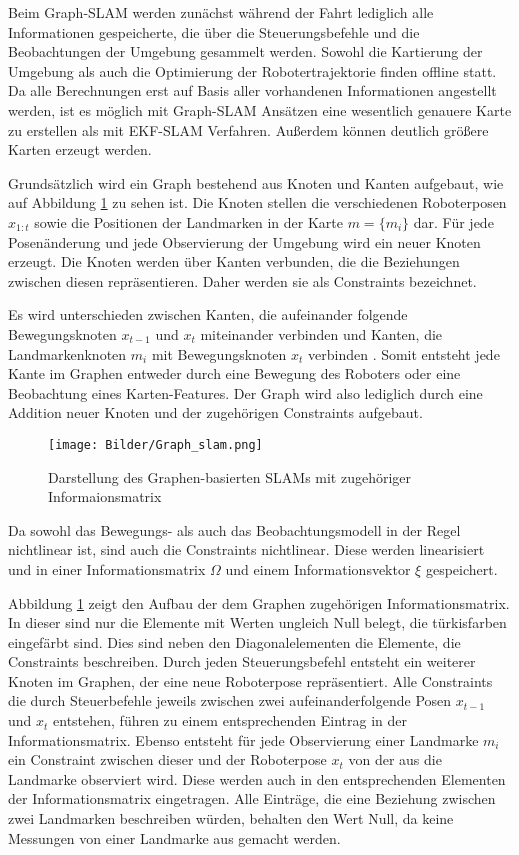 Beim Graph-SLAM werden zunächst während der Fahrt lediglich alle Informationen gespeicherte, die über die Steuerungsbefehle und die Beobachtungen der Umgebung gesammelt werden. Sowohl die Kartierung der Umgebung als auch die Optimierung der Robotertrajektorie finden offline statt. Da alle Berechnungen erst auf Basis aller vorhandenen Informationen  angestellt werden, ist es möglich mit Graph-SLAM Ansätzen eine wesentlich genauere Karte zu erstellen als mit EKF-SLAM Verfahren. Außerdem können deutlich größere Karten erzeugt werden. 

Grundsätzlich wird ein Graph bestehend aus Knoten und Kanten aufgebaut, wie auf Abbildung \ref{fig:Graph} zu sehen ist. Die Knoten stellen die verschiedenen Roboterposen $ x_{1:t} $ sowie die Positionen der Landmarken in der Karte $ m = \{m_i\} $ dar. Für jede Posenänderung und jede Observierung der Umgebung wird ein neuer Knoten erzeugt. Die Knoten werden über Kanten verbunden, die die Beziehungen zwischen diesen repräsentieren. Daher werden sie als Constraints bezeichnet. 

Es wird unterschieden zwischen Kanten, die aufeinander folgende Bewegungsknoten $x_{t-1}$ und $x_t$ miteinander verbinden und Kanten, die Landmarkenknoten $m_i$ mit Bewegungsknoten $x_t$ verbinden \cite{thrun2005}. Somit entsteht jede Kante im  Graphen entweder durch eine Bewegung des Roboters oder eine Beobachtung eines Karten-Features. Der Graph wird also lediglich durch eine Addition neuer Knoten und der zugehörigen Constraints aufgebaut. 

\begin{figure}
\centering
	\texttt{[image: Bilder/Graph\_slam.png]}
	\caption{Darstellung des Graphen-basierten SLAMs mit zugehöriger Informaionsmatrix}
	\label{fig:Graph}
\end{figure}

Da sowohl das Bewegungs- als auch das Beobachtungsmodell in der Regel nichtlinear ist, sind auch die Constraints nichtlinear. Diese werden linearisiert und in einer Informationsmatrix $ \Omega $ und einem Informationsvektor $ \xi $ gespeichert. 

Abbildung \ref{fig:Graph} zeigt den Aufbau der dem Graphen zugehörigen Informationsmatrix. In dieser sind nur die Elemente mit Werten ungleich Null belegt, die türkisfarben eingefärbt sind. Dies sind neben den Diagonalelementen die Elemente, die Constraints beschreiben. Durch jeden Steuerungsbefehl entsteht ein weiterer Knoten im Graphen, der eine neue Roboterpose repräsentiert. Alle Constraints die durch Steuerbefehle jeweils zwischen zwei aufeinanderfolgende Posen $ x_{t-1} $ und $ x_t $ entstehen, führen zu einem entsprechenden Eintrag in der Informationsmatrix. Ebenso entsteht für jede Observierung einer Landmarke $ m_i $ ein Constraint zwischen dieser und der Roboterpose $ x_t $ von der aus die Landmarke observiert wird. Diese werden auch in den entsprechenden Elementen der Informationsmatrix eingetragen. Alle Einträge, die eine Beziehung zwischen zwei Landmarken beschreiben würden, behalten den Wert Null, da keine Messungen von einer Landmarke aus gemacht werden. 

